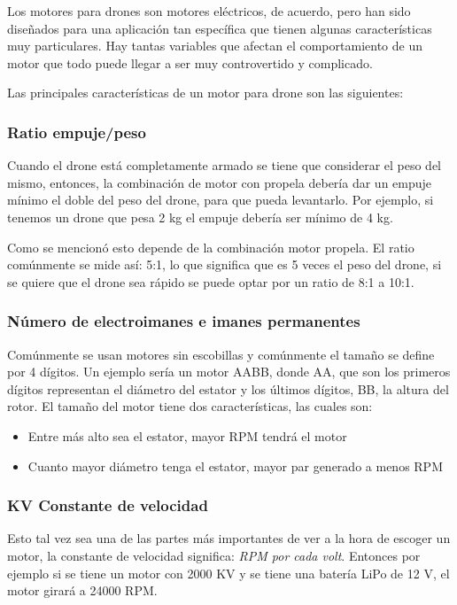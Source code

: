 \documentclass[pdflatex,sn-mathphys-num]{sn-jnl}%
\begin{document}
Los motores para drones son motores eléctricos, de acuerdo, pero han sido diseñados para una aplicación tan específica que tienen algunas características muy particulares. Hay tantas variables que afectan el comportamiento de un motor que todo puede llegar a ser muy controvertido y complicado.

Las principales características de un motor para drone son las siguientes:

\subsubsection{Ratio empuje/peso}

Cuando el drone está completamente armado se tiene que considerar el peso del mismo, entonces, la combinación de motor con propela debería dar un empuje mínimo el doble del peso del drone, para que pueda levantarlo. Por ejemplo, si tenemos un drone que pesa 2 kg el empuje debería ser mínimo de 4 kg.

Como se mencionó esto depende de la combinación motor propela. El ratio comúnmente se mide así: 5:1, lo que significa que es 5 veces el peso del drone, si se quiere que el drone sea rápido se puede optar por un ratio de 8:1 a 10:1.

\subsubsection{Número de electroimanes e imanes permanentes}

Comúnmente se usan motores sin escobillas y comúnmente el tamaño se define por 4 dígitos. Un ejemplo sería un motor AABB, donde AA, que son los primeros dígitos representan el diámetro del estator y los últimos dígitos, BB, la altura del rotor. El tamaño del motor tiene dos características, las cuales son:
\begin{itemize}
    \item Entre más alto sea el estator, mayor RPM tendrá el motor
    \item Cuanto mayor diámetro tenga el estator, mayor par generado a menos RPM
\end{itemize}

\subsubsection{KV Constante de velocidad}

Esto tal vez sea una de las partes más importantes de ver a la hora de escoger un motor, la constante de velocidad significa: \textit{RPM por cada volt}. Entonces por ejemplo si se tiene un motor con 2000 KV y se tiene una batería LiPo de 12 V, el motor girará a 24000 RPM.
\end{document}
